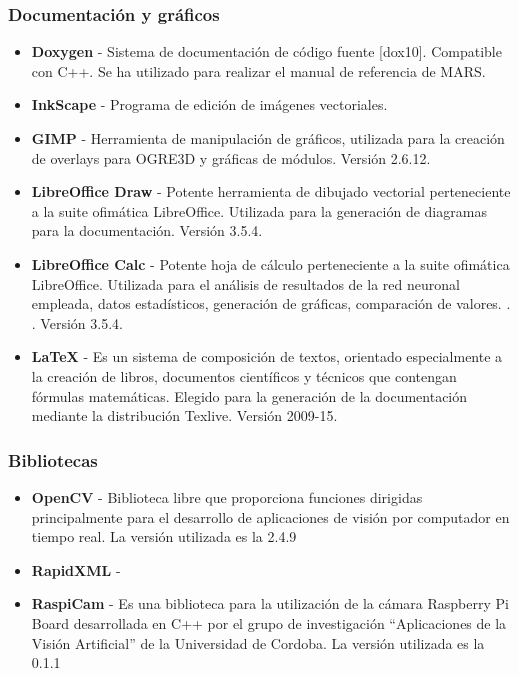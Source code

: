 \subsubsection{Documentación y gráficos}
\begin{itemize}
\item \textbf{Doxygen} - Sistema de documentación de código fuente [dox10]. Compatible con C++. Se ha utilizado para realizar el manual de referencia de MARS.

\item \textbf{InkScape} - Programa de edición de imágenes vectoriales.

\item \textbf{GIMP} - Herramienta de manipulación de gráficos, utilizada para la creación de overlays para OGRE3D y gráficas de módulos. Versión 2.6.12.

\item \textbf{LibreOffice Draw} - Potente herramienta de dibujado vectorial perteneciente a la suite ofimática LibreOffice. Utilizada para la generación de diagramas para la documentación. Versión 3.5.4.

\item \textbf{LibreOffice Calc} - Potente hoja de cálculo perteneciente a la suite ofimática LibreOffice. Utilizada para el análisis de resultados de la red neuronal empleada, datos estadísticos, generación de gráficas, comparación de valores. . . Versión 3.5.4.
\item \textbf{\LaTeX{}} - Es un sistema de composición de textos, orientado especialmente a la creación de libros, documentos científicos y técnicos que contengan fórmulas matemáticas. Elegido para la generación de la documentación mediante la distribución Texlive. Versión 2009-15.
\end{itemize}


\subsubsection{Bibliotecas}
\begin{itemize}
\item \textbf{OpenCV} - Biblioteca libre que proporciona funciones dirigidas principalmente para el desarrollo de aplicaciones de visión por computador en tiempo real. La versión utilizada es la 2.4.9
\item \textbf{RapidXML} - 
\item \textbf{RaspiCam} -  Es una biblioteca para la utilización de la cámara Raspberry Pi Board desarrollada en C++ por el grupo de investigación ``Aplicaciones de la Visión Artificial'' de la Universidad de Cordoba. La versión utilizada es la 0.1.1 
\end{itemize}

